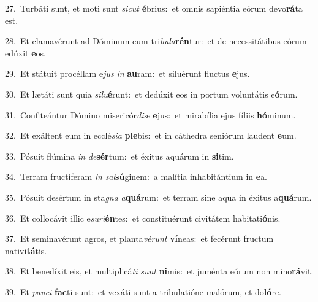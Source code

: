 {\numbfont\textcolor{\numbcolor}{27.}}~Turbáti sunt, et moti sunt \textit{sic}\-\textit{ut} \textbf{é}\-brius:~\star et omnis sapiéntia eórum devo\-\textbf{rá}\-ta est.\par
{\numbfont\textcolor{\numbcolor}{28.}}~Et clamavérunt ad Dóminum cum tri\-\textit{bu}\-\textit{la}\textbf{rén}tur:~\star et de necessitátibus eórum edúxit \textbf{e}\-os.\par
{\numbfont\textcolor{\numbcolor}{29.}}~Et státuit procéllam e\textit{jus} \textit{in} \textbf{au}\-ram:~\star et siluérunt fluctus \textbf{e}\-jus.\par
{\numbfont\textcolor{\numbcolor}{30.}}~Et lætáti sunt quia \textit{si}\-\textit{lu}\textbf{é}runt:~\star et dedúxit eos in portum voluntátis e\-\textbf{ó}\-rum.\par
{\numbfont\textcolor{\numbcolor}{31.}}~Confiteántur Dómino misericór\-\textit{di}\-\textit{æ} \textbf{e}\-jus:~\star et mirabília ejus fíliis \textbf{hó}\-minum.\par
{\numbfont\textcolor{\numbcolor}{32.}}~Et exáltent eum in ecclé\-\textit{si}\-\textit{a} \textbf{ple}\-bis:~\star et in cáthedra seniórum laudent \textbf{e}\-um.\par
{\numbfont\textcolor{\numbcolor}{33.}}~Pósuit flúmina \textit{in} \textit{de}\-\textbf{sér}tum:~\star et éxitus aquárum in \textbf{si}\-tim.\par
{\numbfont\textcolor{\numbcolor}{34.}}~Terram fructíferam \textit{in} \textit{sal}\-\textbf{sú}ginem:~\star a malítia inhabitántium in \textbf{e}\-a.\par
{\numbfont\textcolor{\numbcolor}{35.}}~Pósuit desértum in sta\textit{gna} \textit{a}\-\textbf{quá}rum:~\star et terram sine aqua in éxitus a\-\textbf{quá}\-rum.\par
{\numbfont\textcolor{\numbcolor}{36.}}~Et collocávit illic e\-\textit{su}\-\textit{ri}\textbf{én}tes:~\star et constituérunt civitátem habitati\-\textbf{ó}\-nis.\par
{\numbfont\textcolor{\numbcolor}{37.}}~Et seminavérunt agros, et planta\-\textit{vé}\-\textit{runt} \textbf{ví}\-neas:~\star et fecérunt fructum nativi\-\textbf{tá}\-tis.\par
{\numbfont\textcolor{\numbcolor}{38.}}~Et benedíxit eis, et multiplicá\textit{ti} \textit{sunt} \textbf{ni}\-mis:~\star et juménta eórum non mino\-\textbf{rá}\-vit.\par
{\numbfont\textcolor{\numbcolor}{39.}}~Et \textit{pau}\-\textit{ci} \textbf{fac}\-ti sunt:~\star et vexáti sunt a tribulatióne malórum, et do\-\textbf{ló}\-re.\par
